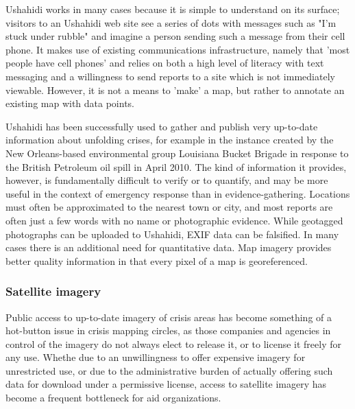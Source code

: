 \documentclass[11pt]{report}
\begin{document}
Ushahidi works in many cases because it is simple to understand on its surface; visitors to an Ushahidi web site see a series of dots with messages such as "I'm stuck under rubble" and imagine a person sending such a message from their cell phone. It makes use of existing communications infrastructure, namely that 'most people have cell phones' and relies on both a high level of literacy with text messaging and a willingness to send reports to a site which is not immediately viewable. However, it is not a means to 'make' a map, but rather to annotate an existing map with data points.

Ushahidi has been successfully used to gather and publish very up-to-date information about unfolding crises, for example in the instance created by the New Orleans-based environmental group Louisiana Bucket Brigade in response to the British Petroleum oil spill in April 2010. The kind of information it provides, however, is fundamentally difficult to verify or to quantify, and may be more useful in the context of emergency response than in evidence-gathering. Locations must often be approximated to the nearest town or city, and most reports are often just a few words with no name or photographic evidence. While geotagged photographs can be uploaded to Ushahidi, EXIF data can be falsified. In many cases there is an additional need for quantitative data. Map imagery provides better quality information in that every pixel of a map is georeferenced.  


\subsubsection{Satellite imagery}
\label{subsec:satelliterelease}

Public access to up-to-date imagery of crisis areas has become something of a hot-button issue in crisis mapping circles, as those companies and agencies in control of the imagery do not always elect to release it, or to license it freely for any use. Whethe due to an unwillingness to offer expensive imagery for unrestricted use, or due to the administrative burden of actually offering such data for download under a permissive license, access to satellite imagery has become a frequent bottleneck for aid organizations. 
\end{document}
